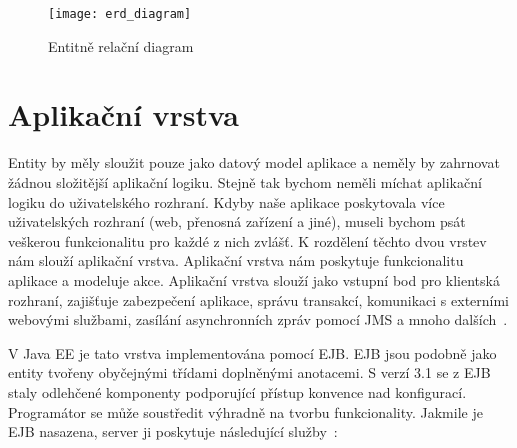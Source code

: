 \documentclass[122pt,oneside]{fithesis}
\begin{document}
\begin{figure}[!ht]
\centering
\texttt{[image: erd\_diagram]}
\caption{Entitně relační diagram}
\label{img:erd}
\end{figure}


\chapter{Aplikační vrstva}
Entity by měly sloužit pouze jako datový model aplikace a neměly by zahrnovat žádnou složitější aplikační logiku. Stejně tak bychom neměli míchat aplikační logiku do uživatelského rozhraní.  Kdyby naše aplikace poskytovala více uživatelských rozhraní (web, přenosná zařízení a jiné), museli bychom psát veškerou funkcionalitu pro každé z nich zvlášť. K rozdělení těchto dvou vrstev nám slouží aplikační vrstva. Aplikační vrstva nám poskytuje funkcionalitu aplikace a modeluje akce. Aplikační vrstva slouží jako vstupní bod pro klientská rozhraní, zajišťuje zabezpečení aplikace, správu transakcí, komunikaci s externími webovými službami, zasílání asynchronních zpráv pomocí JMS a mnoho dalších~\cite{goncalves09}. 

V Java EE je tato vrstva implementována pomocí EJB. EJB jsou podobně jako entity tvořeny obyčejnými třídami doplněnými anotacemi. S verzí 3.1 se z EJB staly odlehčené komponenty podporující přístup konvence nad konfigurací. Programátor se může soustředit výhradně na tvorbu funkcionality. Jakmile je EJB nasazena,  server ji poskytuje následující služby~\cite{wikiEJB}:
\end{document}
